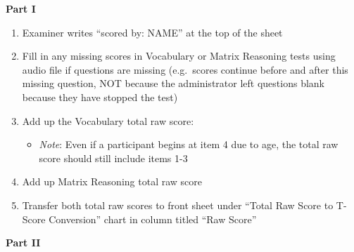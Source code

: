\documentclass[
]{book}
\providecommand{\tightlist}{%
  \setlength{\itemsep}{0pt}\setlength{\parskip}{0pt}}
\begin{document}
\textbf{Part I}

\begin{enumerate}
\def\labelenumi{\arabic{enumi}.}
\tightlist
\item
  Examiner writes ``scored by: NAME'' at the top of the sheet
\item
  Fill in any missing scores in Vocabulary or Matrix Reasoning tests using audio file if questions are missing (e.g.~scores continue before and after this missing question, NOT because the administrator left questions blank because they have stopped the test)
\item
  Add up the Vocabulary total raw score:

  \begin{itemize}
  \tightlist
  \item
    \emph{Note}: Even if a participant begins at item 4 due to age, the total raw score should still include items 1-3
  \end{itemize}
\item
  Add up Matrix Reasoning total raw score
\item
  Transfer both total raw scores to front sheet under ``Total Raw Score to T-Score Conversion'' chart in column titled ``Raw Score''
\end{enumerate}

\textbf{Part II}
\end{document}
